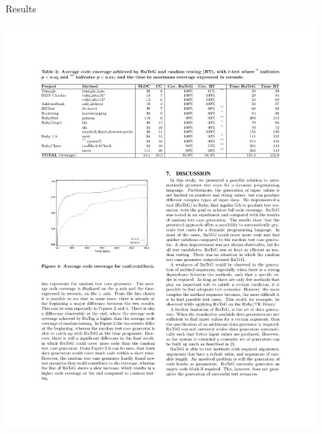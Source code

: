 \documentclass{beamer}
\begin{document}
\begin{frame}{Results}
  \begin{center}
    \includegraphics[width=0.9\textwidth]{ruteg_fig4}
  \end{center}
\end{frame}
\end{document}

